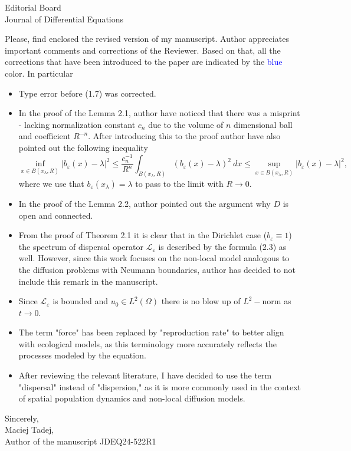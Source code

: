 \documentclass{letter}
\begin{document}
\begin{letter}{%
    Editorial Board\\
    Journal of Differential Equations\\
}

\date{\today}

\opening{}

Please, find enclosed the revised version of my manuscript. Author appreciates important comments and corrections of the Reviewer. Based on that, all the corrections that have been introduced to the paper are indicated by the \textcolor{blue}{blue} color. In particular

\begin{itemize}
    \item Type error before (1.7) was corrected.
    \item In the proof of the Lemma 2.1, author have noticed that there was a misprint - lacking normalization constant $c_n$ due to the volume of $n$ dimensional ball and coefficient $R^{-n}$. After introducing this to the proof author have also pointed out the following inequality
    $$\inf_{x \in B(x_\lambda, R)} |b_\varepsilon(x) - \lambda|^2 \leq \frac{c_n^{-1}}{R^n}\int_{B(x_\lambda, R)}\left(b_\varepsilon(x) - \lambda \right)^2 \:dx \leq \sup_{x \in B(x_\lambda, R)} |b_\varepsilon(x) - \lambda|^2,$$
    where we use that $b_\varepsilon(x_\lambda) = \lambda$ to pass to the limit with $R \rightarrow 0$.
    \item In the proof of the Lemma 2.2, author pointed out the argument why $D$ is open and connected.
    \item From the proof of Theorem 2.1 it is clear that in the Dirichlet case ($b_\varepsilon \equiv 1$) the spectrum of dispersal operator $\mathcal{L}_\varepsilon$ is described by the formula (2.3) as well. However, since this work focuses on the non-local model analogous to the diffusion problems with Neumann boundaries, author has decided to not include this remark in the manuscript.
    \item Since $\mathcal{L}_\varepsilon$ is bounded and $u_0 \in L^2(\Omega)$ there is no blow up of $L^2-$norm as $t \rightarrow 0$.
    \item The term "force" has been replaced by "reproduction rate" to better align with ecological models, as this terminology more accurately reflects the processes modeled by the equation.
    \item After reviewing the relevant literature, I have decided to use the term "dispersal" instead of "dispersion," as it is more commonly used in the context of spatial population dynamics and non-local diffusion models.
\end{itemize}

\closing{Sincerely, \\ Maciej Tadej, \\ Author of the manuscript JDEQ24-522R1}

\end{letter}
\end{document}
